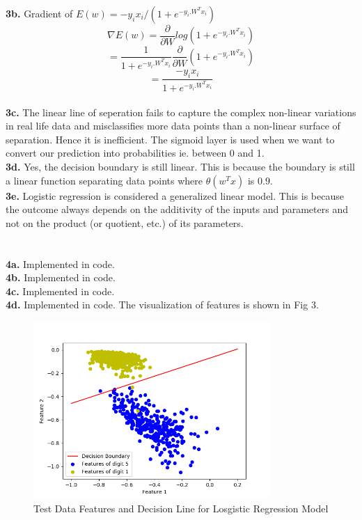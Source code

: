 \documentclass[letterpaper]{article}
\begin{document}
\noindent \textbf{3b.} Gradient of \(E(w) = -y_ix_i/(1+e^{-y_i.W^Tx_i})\)\\

\[\nabla E(w) = \frac{\partial }{\partial W} log(1+e^{-y_i.W^Tx_i})\]
\[= \frac{1}{1+e^{-y_i.W^Tx_i}} \frac{\partial }{\partial W} (1+e^{-y_i.W^Tx_i})\]
\[= \frac{ -y_ix_i}{1+e^{-y_i.W^Tx_i}}\]\\

\noindent \textbf{3c.} The linear line of seperation fails to capture the complex non-linear variations in real life data and misclassifies more data points than a non-linear surface of separation. Hence it is inefficient. The sigmoid layer is used when we want to convert our prediction into probabilities ie. between 0 and 1.\\

\noindent \textbf{3d.} Yes, the decision boundary is still linear. This is because the boundary is still a linear function separating data points where \(\theta (w^Tx)\) is \(0.9\). \\

\noindent \textbf{3e.} Logistic regression is considered a generalized linear model. This is because the outcome always depends on the additivity of the inputs and parameters and not on the product (or quotient, etc.) of its parameters. \\\\

\\

\noindent \textbf{4a.} Implemented in code.\\

\noindent \textbf{4b.} Implemented in code.\\

\noindent \textbf{4c.} Implemented in code.\\

\noindent \textbf{4d.} Implemented in code. The visualization of features is shown in Fig 3.\\

 \begin{figure}
	\centering
	\includegraphics[width=0.8\textwidth]{test_features_img4.png}
	\caption{\label{fig:data}Test Data Features and Decision Line for Losgistic Regression Model}
\end{figure}
\end{document}
